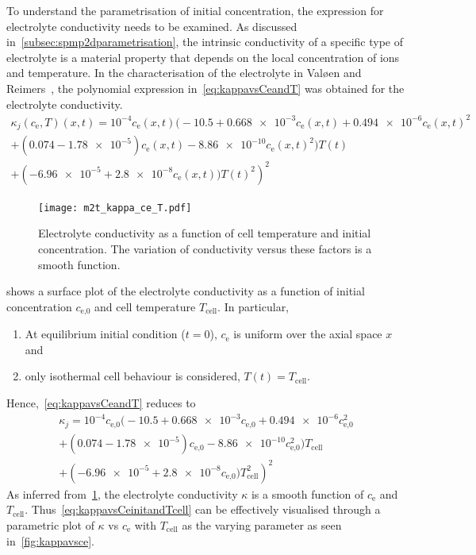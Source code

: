 To  understand  the parametrisation  of  initial  concentration, the  expression
for   electrolyte   conductivity   needs    to   be   examined.   As   discussed
in~\cref{subsec:spmp2dparametrisation}, the intrinsic conductivity of a specific
type  of  electrolyte  is  a  material   property  that  depends  on  the  local
concentration of  ions and  temperature. In the characterisation of the
electrolyte in Valøen and  Reimers~\cite{Valoen2005}, the polynomial expression
in~\cref{eq:kappavsCeandT} was obtained for the electrolyte conductivity.
\begin{multline}\label{eq:kappavsCeandT}
    \kappa_j(c_\text{e},T)(x,t) =  10^{-4} c_\text{e}(x,t) \bigl(-10.5 + \num{0.668e-3} c_\text{e}(x,t) + \num{0.494e-6}  c_\text{e}{(x,t)}^2\\
    + (0.074 - \num{1.78e-5}) c_\text{e}(x,t) - \num{8.86e-10} c_\text{e}{(x,t)}^2 \bigr)T(t)\\
	+ \left(\num{-6.96e-5} + \num{2.8e-8} c_\text{e}{(x,t)})T(t)^2\right)^2
\end{multline}

\begin{figure}[!htb]
    \centering
    \texttt{[image: m2t\_kappa\_ce\_T.pdf]}
    \caption[Surface plot of electrolyte conductivity]
    {Electrolyte conductivity as a function of cell temperature and initial
        concentration. The variation of conductivity versus these factors is a
    smooth function.}
    \label{fig:kappavsCeandT}
\end{figure}

 shows  a surface  plot of the  electrolyte conductivity
as  a function  of  initial concentration  $c_\text{e,0}$  and cell  temperature
$T_\text{cell}$. In particular,
\begin{enumerate}%
    \item At  equilibrium  initial condition ($t=0$), $c_\text{e}$ is uniform over the axial space $x$ and
    \item only isothermal cell behaviour is considered, \ie{} $T(t) = T_\text{cell}$.
\end{enumerate}
Hence,~\cref{eq:kappavsCeandT} reduces to
\begin{multline}\label{eq:kappavsCeinitandTcell}
    \kappa_j =  10^{-4} c_\text{e,0} \bigl(-10.5 + \num{0.668e-3} c_\text{e,0} + \num{0.494e-6}  c_\text{e,0}^2\\
        + (0.074 - \num{1.78e-5}) c_\text{e,0} - \num{8.86e-10}
    c_\text{e,0}^2 \bigr)T_\text{cell}\\
	+ \left(\num{-6.96e-5} + \num{2.8e-8} c_\text{e,0})T_\text{cell}^2\right)^2
\end{multline}
As   inferred   from~\cref{fig:kappavsCeandT},  the   electrolyte   conductivity
$\kappa$   is   a  smooth   function   of   $c_\text{e}$  and   $T_\text{cell}$.
Thus~\cref{eq:kappavsCeinitandTcell}  can be  effectively  visualised through  a
parametric plot of $\kappa$ vs  $c_\text{e}$ with $T_\text{cell}$ as the varying
parameter as seen in~\cref{fig:kappavsce}.

